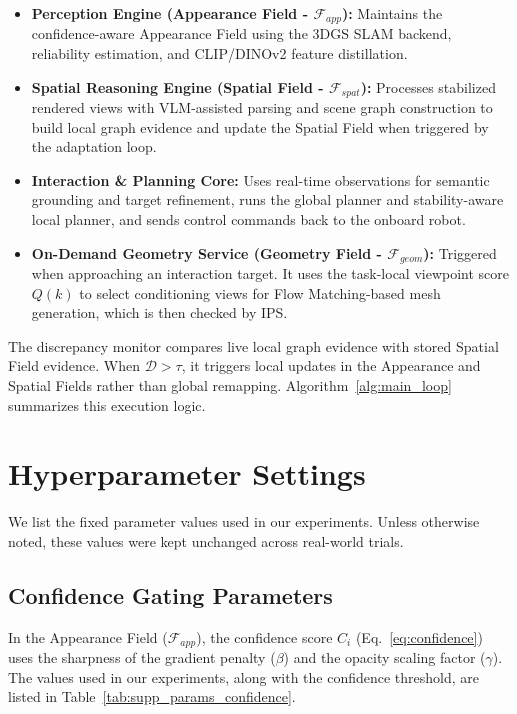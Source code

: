 \documentclass[conference]{IEEEtran}
\begin{document}
\begin{itemize}
    \item \textbf{Perception Engine (Appearance Field - $\mathcal{F}_{app}$):} Maintains the confidence-aware Appearance Field using the 3DGS SLAM backend, reliability estimation, and CLIP/DINOv2 feature distillation.

    \item \textbf{Spatial Reasoning Engine (Spatial Field - $\mathcal{F}_{spat}$):} Processes stabilized rendered views with VLM-assisted parsing and scene graph construction to build local graph evidence and update the Spatial Field when triggered by the adaptation loop.

    \item \textbf{Interaction \& Planning Core:} Uses real-time observations for semantic grounding and target refinement, runs the global planner and stability-aware local planner, and sends control commands back to the onboard robot.

    \item \textbf{On-Demand Geometry Service (Geometry Field - $\mathcal{F}_{geom}$):} Triggered when approaching an interaction target. It uses the task-local viewpoint score $Q(k)$ to select conditioning views for Flow Matching-based mesh generation, which is then checked by IPS.
\end{itemize}

The discrepancy monitor compares live local graph evidence with stored Spatial Field evidence. When $\mathcal{D}>\tau$, it triggers local updates in the Appearance and Spatial Fields rather than global remapping. Algorithm~\ref{alg:main_loop} summarizes this execution logic.


\section{Hyperparameter Settings}
\label{sec:hyperparameters}

We list the fixed parameter values used in our experiments. Unless otherwise noted, these values were kept unchanged across real-world trials.

\subsection{Confidence Gating Parameters}
In the Appearance Field ($\mathcal{F}_{app}$), the confidence score $C_i$ (Eq.~\ref{eq:confidence}) uses the sharpness of the gradient penalty ($\beta$) and the opacity scaling factor ($\gamma$). The values used in our experiments, along with the confidence threshold, are listed in Table~\ref{tab:supp_params_confidence}.
\end{document}
